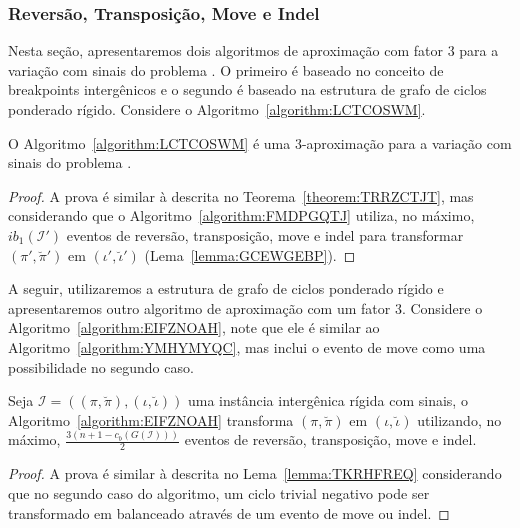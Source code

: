 \subsubsection{Reversão, Transposição, Move e Indel}

Nesta seção, apresentaremos dois algoritmos de aproximação com fator $3$ para a variação com sinais do problema \SbIRTMI{}. O primeiro é baseado no conceito de breakpoints intergênicos e o segundo é baseado na estrutura de grafo de ciclos ponderado rígido. Considere o Algoritmo~\ref{algorithm:LCTCOSWM}.



\begin{theorem}\label{theorem:KKKBVPAY}
O Algoritmo~\ref{algorithm:LCTCOSWM} é uma $3$-aproximação para a variação com sinais do problema \SbIRTMI{}.
\end{theorem}
\begin{proof}
A prova é similar à descrita no Teorema~\ref{theorem:TRRZCTJT}, mas considerando que o Algoritmo~\ref{algorithm:FMDPGQTJ} utiliza, no máximo, $ib_1(\mathcal{I'})$ eventos de reversão, transposição, move e indel para transformar $(\pi',\breve\pi')$ em $(\iota',\breve\iota')$ (Lema~\ref{lemma:GCEWGEBP}).
\end{proof}

A seguir, utilizaremos a estrutura de grafo de ciclos ponderado rígido e apresentaremos outro algoritmo de aproximação com um fator $3$. Considere o Algoritmo~\ref{algorithm:EIFZNOAH}, note que ele é similar ao Algoritmo~\ref{algorithm:YMHYMYQC}, mas inclui o evento de move como uma possibilidade no segundo caso.



\begin{lemma}\label{lemma:TEVTTPGB}
Seja $\mathcal{I} = ((\pi,\breve\pi),(\iota,\breve\iota))$ uma instância intergênica rígida com sinais, o Algoritmo~\ref{algorithm:EIFZNOAH} transforma $(\pi,\breve\pi)$ em $(\iota,\breve\iota)$ utilizando, no máximo, $\frac{3(n+1 - c_b(G(\mathcal{I})))}{2}$ eventos de reversão, transposição, move e indel.
\end{lemma}
\begin{proof}
A prova é similar à descrita no Lema~\ref{lemma:TKRHFREQ} considerando que no segundo caso do algoritmo, um ciclo trivial negativo pode ser transformado em balanceado através de um evento de move ou indel.
\end{proof}

